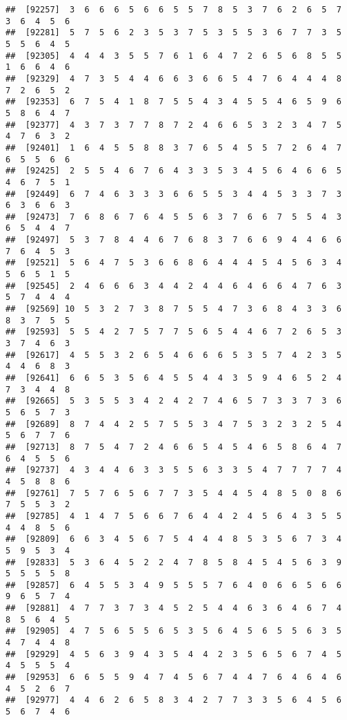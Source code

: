 \documentclass[
]{book}
\begin{document}
\begin{verbatim}
##  [92257]  3  6  6  6  5  6  6  5  5  7  8  5  3  7  6  2  6  5  7  3  6  4  5  6
##  [92281]  5  7  5  6  2  3  5  3  7  5  3  5  5  3  6  7  7  3  5  5  5  6  4  5
##  [92305]  4  4  4  3  5  5  7  6  1  6  4  7  2  6  5  6  8  5  5  1  6  6  4  6
##  [92329]  4  7  3  5  4  4  6  6  3  6  6  5  4  7  6  4  4  4  8  7  2  6  5  2
##  [92353]  6  7  5  4  1  8  7  5  5  4  3  4  5  5  4  6  5  9  6  5  8  6  4  7
##  [92377]  4  3  7  3  7  7  8  7  2  4  6  6  5  3  2  3  4  7  5  4  7  6  3  2
##  [92401]  1  6  4  5  5  8  8  3  7  6  5  4  5  5  7  2  6  4  7  6  5  5  6  6
##  [92425]  2  5  5  4  6  7  6  4  3  3  5  3  4  5  6  4  6  6  5  4  6  7  5  1
##  [92449]  6  7  4  6  3  3  3  6  6  5  5  3  4  4  5  3  3  7  3  6  3  6  6  3
##  [92473]  7  6  8  6  7  6  4  5  5  6  3  7  6  6  7  5  5  4  3  6  5  4  4  7
##  [92497]  5  3  7  8  4  4  6  7  6  8  3  7  6  6  9  4  4  6  6  7  6  4  5  3
##  [92521]  5  6  4  7  5  3  6  6  8  6  4  4  4  5  4  5  6  3  4  5  6  5  1  5
##  [92545]  2  4  6  6  6  3  4  4  2  4  4  6  4  6  6  4  7  6  3  5  7  4  4  4
##  [92569] 10  5  3  2  7  3  8  7  5  5  4  7  3  6  8  4  3  3  6  8  3  7  5  5
##  [92593]  5  5  4  2  7  5  7  7  5  6  5  4  4  6  7  2  6  5  3  3  7  4  6  3
##  [92617]  4  5  5  3  2  6  5  4  6  6  6  5  3  5  7  4  2  3  5  4  4  6  8  3
##  [92641]  6  6  5  3  5  6  4  5  5  4  4  3  5  9  4  6  5  2  4  7  3  4  4  8
##  [92665]  5  3  5  5  3  4  2  4  2  7  4  6  5  7  3  3  7  3  6  5  6  5  7  3
##  [92689]  8  7  4  4  2  5  7  5  5  3  4  7  5  3  2  3  2  5  4  5  6  7  7  6
##  [92713]  8  7  5  4  7  2  4  6  6  5  4  5  4  6  5  8  6  4  7  6  4  5  5  6
##  [92737]  4  3  4  4  6  3  3  5  5  6  3  3  5  4  7  7  7  7  4  4  5  8  8  6
##  [92761]  7  5  7  6  5  6  7  7  3  5  4  4  5  4  8  5  0  8  6  7  5  5  3  2
##  [92785]  4  1  4  7  5  6  6  7  6  4  4  2  4  5  6  4  3  5  5  4  4  8  5  6
##  [92809]  6  6  3  4  5  6  7  5  4  4  4  8  5  3  5  6  7  3  4  5  9  5  3  4
##  [92833]  5  3  6  4  5  2  2  4  7  8  5  8  4  5  4  5  6  3  9  5  5  5  5  8
##  [92857]  6  4  5  5  3  4  9  5  5  5  7  6  4  0  6  6  5  6  6  9  6  5  7  4
##  [92881]  4  7  7  3  7  3  4  5  2  5  4  4  6  3  6  4  6  7  4  8  5  6  4  5
##  [92905]  4  7  5  6  5  5  6  5  3  5  6  4  5  6  5  5  6  3  5  4  7  4  4  8
##  [92929]  4  5  6  3  9  4  3  5  4  4  2  3  5  6  5  6  7  4  5  4  5  5  5  4
##  [92953]  6  6  5  5  9  4  7  4  5  6  7  4  4  7  6  4  6  4  6  4  5  2  6  7
##  [92977]  4  4  6  2  6  5  8  3  4  2  7  7  3  3  5  6  4  5  6  5  6  7  4  6

\end{verbatim}
\end{document}
